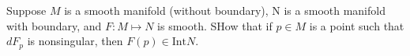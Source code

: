Suppose $M$ is a smooth manifold (without boundary), N is a smooth manifold with boundary, and $F:M \mapsto N$ is smooth.  SHow that if $p \in M$ is a point such that $dF_p$ is nonsingular, then $F(p) \in \textrm{Int} N$.